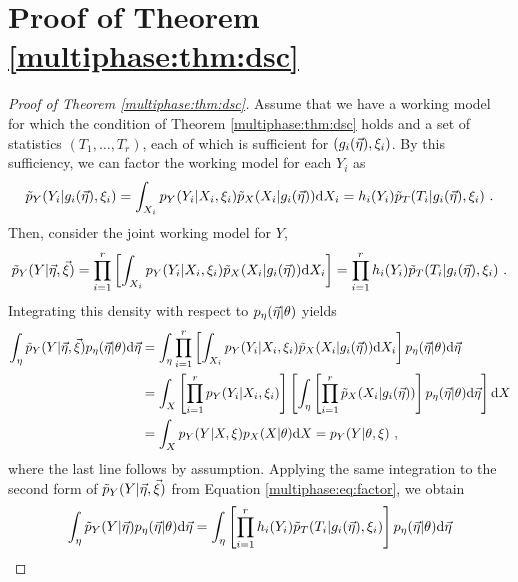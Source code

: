 \section{Proof of Theorem \ref{multiphase:thm:dsc}}
\label{multiphase:sec:dscProof}

\begin{proof}[Proof of Theorem \ref{multiphase:thm:dsc}]
Assume that we have a working model for which the condition of Theorem \ref{multiphase:thm:dsc} holds and a set of statistics $(T_1, \ldots, T_r)$, each of which is sufficient for $(g_i(\vec {\eta}), \xi_i)$.
By this sufficiency, we can factor the working model for each $Y_i$ as
\begin{equation}
 \tilde{p}_Y (Y_i | g_i(\vec {\eta}), \xi_i) = \int_{X_i} p_Y(Y_i | X_i, \xi_i) \tilde{p}_X(X_i | g_i(\vec {\eta})) \mathrm{d} X_i = h_i(Y_i) \tilde{p}_T(T_i | g_i(\vec {\eta}), \xi_i) \ .
\end{equation}
Then, consider the joint working model for $Y$,
\begin{equation}
 \pywork(Y | \bm \workparam, \bm \obsparam) = \prod_{i=1}^{r} \left[ \int_{X_i} \pobs(Y_i | X_i, \obsparam_i) \pwork(X_i | g_i(\bm \workparam)) \dd X_i \right] = \prod_{i=1}^{r} h_i(Y_i) \tilde{p}_T(T_i | g_i(\bm \workparam), \obsparam_i) \ .
\label{multiphase:eq:factor}
\end{equation}
Integrating this density with respect to $p_\eta(\vec {\eta} | \theta)$ yields
\begin{align}
 \int_{\eta} \tilde{p}_Y(Y | \vec {\eta}, \vec {\xi}) p_\eta(\vec {\eta} | \theta) \mathrm{d} \vec {\eta} &= \int_{\eta} \prod_{i=1}^{r} \left[ \int_{X_i} p_Y(Y_i | X_i, \xi_i) \tilde{p}_X(X_i | g_i(\vec {\eta})) \mathrm{d} X_i \right] p_\eta(\vec {\eta} | \theta) \mathrm{d} \vec {\eta} \\
 \nonumber
 &= \int_{X} \left[ \prod_{i=1}^{r} p_Y(Y_i | X_i, \xi_i) \right] \left[ \int_{\eta} \left[ \prod_{i=1}^{r} \tilde{p}_X(X_i | g_i(\vec {\eta})) \right] p_\eta(\vec {\eta} | \theta) \mathrm{d} \vec {\eta} \right] \mathrm{d} X \\
 \nonumber
 &= \int_{X} p_Y(Y | X, \xi) p_X(X | \theta) \mathrm{d} X = p_Y(Y | \theta, \xi) \ ,
\end{align}
where the last line follows by assumption.
Applying the same integration to the second form of $\tilde{p}_Y(Y | \vec {\eta}, \vec {\xi})$ from Equation \ref{multiphase:eq:factor}, we obtain
\begin{align}
 \int_{\eta} \pywork(Y | \bm \workparam) p_\workparam(\bm \workparam | \param) \dd \bm \workparam &= \int_{\eta} \left[ \prod_{i=1}^{r} h_i(Y_i) \tilde{p}_T(T_i | g_i(\bm \workparam), \obsparam_i) \right] p_\workparam(\bm \workparam | \param) \dd \bm \workparam \\

\end{align}
\end{proof}
